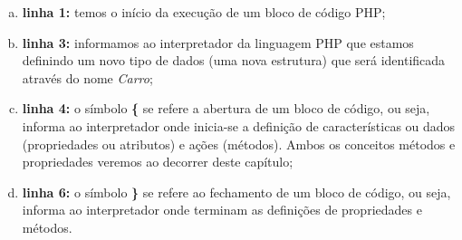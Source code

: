 \begin{enumerate}[a)]
    \item \textbf{linha 1:} temos o início da execução de um bloco de código
    PHP;
    \item \textbf{linha 3:} informamos ao interpretador da linguagem PHP que 
    estamos definindo um novo tipo de dados (uma nova estrutura) que será 
    identificada através do nome \textit{Carro};
    \item \textbf{linha 4:} o símbolo \textbf{\{} se refere a abertura de um
    bloco de código, ou seja, informa ao interpretador onde inicia-se a definição de 
    características ou dados (propriedades ou atributos) e ações (métodos). 
    Ambos os conceitos métodos e propriedades veremos ao decorrer deste
    capítulo;
    \item \textbf{linha 6:} o símbolo \textbf{\}} se refere ao fechamento de um
    bloco de código, ou seja, informa ao interpretador onde terminam as
    definições de propriedades e métodos.
\end{enumerate}